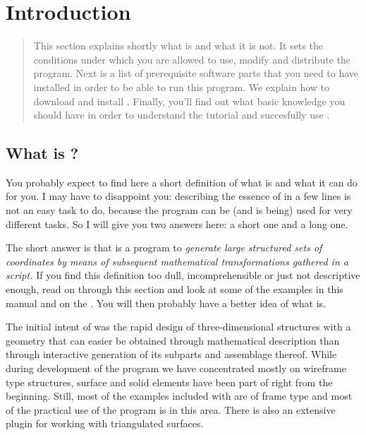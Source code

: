 
\chapter{Introduction}
\label{cha:introduction}

\ifhtml
\begin{abstract}
\fi
\noindent
This section explains shortly what \pyformex is and what it is not. It sets the conditions under which you are allowed to use, modify and distribute the program. Next is a list of prerequisite software parts that you need to have installed in order to be able to run this program. We explain how to download and install \pyformex. Finally, you'll find out what basic knowledge you should have in order to understand the tutorial and succesfully use \pyformex. 
\ifhtml\end{abstract}\fi


\section{What is \pyformex?}
\label{sec:what-pyformex}

You probably expect to find here a short definition of what \pyformex is and what it can do for you. I may have to disappoint you: describing the essence of \pyformex in a few lines is not an easy task to do, because the program can be (and is being) used for very different tasks. So I will give you two answers here: a short one and a long one.

The short answer is that \pyformex is a program to \emph{generate large structured sets of coordinates by means of subsequent mathematical transformations gathered in a script.}
If you find this definition too dull, incomprehensible or just not descriptive enough, read on through this section and look at some of the examples in this manual and on the . You will then probably have a better idea of what \pyformex{} is. 

The initial intent of \pyformex was the rapid design of three-dimensional structures with a geometry that can easier be obtained through mathematical description than through interactive generation of its subparts and assemblage thereof. While during development of the program we have concentrated mostly on wireframe type structures, surface and solid elements have been part of \pyformex right from the beginning. Still, most of the examples included with \pyformex are of frame type and most of the practical use of the program is in this area. There is also an extensive plugin for working with triangulated surfaces.

